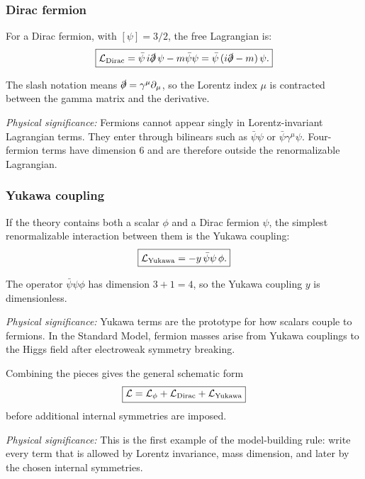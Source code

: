 \documentclass[../main.tex]{subfiles}
\begin{document}
\subsubsection*{Dirac fermion}

For a Dirac fermion, with $[\psi]=3/2$, the free Lagrangian is:
\begin{equation}
  \boxed{
  \mathcal{L}_{\rm Dirac}
  =
  \bar\psi\,i\slashed{\partial}\,\psi
  -m\bar\psi\psi
  =
  \bar\psi\,(i\slashed{\partial}-m)\,\psi.}
  \label{eq:lec09:dirac-lagrangian-review}
\end{equation}

The slash notation means $\slashed{\partial}=\gamma^\mu\partial_\mu$, so the Lorentz index $\mu$ is contracted between the gamma matrix and the derivative.

\textit{Physical significance:} Fermions cannot appear singly in Lorentz-invariant Lagrangian terms.  They enter through bilinears such as $\bar\psi\psi$ or $\bar\psi\gamma^\mu\psi$.  Four-fermion terms have dimension $6$ and are therefore outside the renormalizable Lagrangian.

\subsubsection*{Yukawa coupling}

If the theory contains both a scalar $\phi$ and a Dirac fermion $\psi$, the simplest renormalizable interaction between them is the Yukawa coupling:
\begin{equation}
  \boxed{
  \mathcal{L}_{\rm Yukawa}
  =
  -y\,\bar\psi\psi\,\phi.}
  \label{eq:lec09:yukawa}
\end{equation}

The operator $\bar\psi\psi\phi$ has dimension $3+1=4$, so the Yukawa coupling $y$ is dimensionless.

\textit{Physical significance:} Yukawa terms are the prototype for how scalars couple to fermions.  In the Standard Model, fermion masses arise from Yukawa couplings to the Higgs field after electroweak symmetry breaking.

Combining the pieces gives the general schematic form
\begin{equation}
  \boxed{
  \mathcal{L}
  =
  \mathcal{L}_{\phi}
  +
  \mathcal{L}_{\rm Dirac}
  +
  \mathcal{L}_{\rm Yukawa}
  }
  \label{eq:lec09:scalar-fermion-general}
\end{equation}
before additional internal symmetries are imposed.

\textit{Physical significance:} This is the first example of the model-building rule: write every term that is allowed by Lorentz invariance, mass dimension, and later by the chosen internal symmetries.
\end{document}
